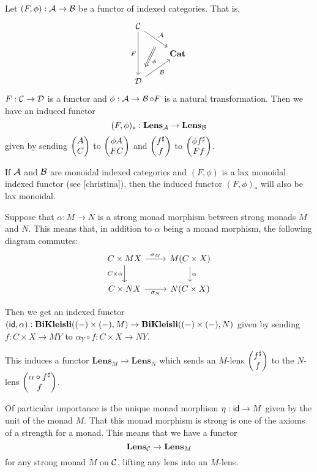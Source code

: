 \begin{prop}
  Let $(F, \phi) : \operatorname{\mathcal{A}} \to \operatorname{\mathcal{B}}$ be a functor of indexed categories. That is,
  \[
    \begin{tikzcd}
      \Ca \arrow[rd,"\Aa"{name=U} ] \arrow[dd,"F"']& \\
      & \textbf{Cat} \\
      \Da \arrow[Rightarrow,
      from=U, shorten <= 1em, shorten >= 1em, "\phi"] \arrow[ur, "\Ba"'] 
    \end{tikzcd}
  \]
  $F : \operatorname{\mathcal{C}} \to \operatorname{\mathcal{D}}$ is a functor and $\phi : \operatorname{\mathcal{A}} \to \operatorname{\mathcal{B}} \circ F$ is a natural
  transformation. Then we have an induced functor
  $$(F, \phi)_{\ast} : \textbf{Lens}_{\operatorname{\mathcal{A}}} \to \textbf{Lens}_{\operatorname{\mathcal{B}}}$$
  given by sending $\begin{pmatrix}{A} \\ {C} \end{pmatrix}$ to $\begin{pmatrix}{\phi A} \\ {F C} \end{pmatrix}$ and
  $\begin{pmatrix}{f^{\sharp}} \\ {f} \end{pmatrix}$ to $\begin{pmatrix}{\phi f^{\sharp}} \\ {F f} \end{pmatrix}$.

  If $\operatorname{\mathcal{A}}$ and $\operatorname{\mathcal{B}}$ are monoidal indexed categories and $(F, \phi)$ is a lax
  monoidal indexed functor (see [christina]), then the induced functor $(F,
  \phi)_{\ast}$ will also be lax monoidal.
\end{prop}

\begin{ex}
Suppose that $\alpha : M \to N$ is a strong monad morphism between strong monads $M$
and $N$. This means that, in addition to $\alpha$ being a monad morphism, the
following diagram commutes:
\[
  \begin{tikzcd}
    C \times M X \arrow[r,"\sigma_M"] \arrow[d, "C \times \alpha"'] & M(C \times X) \arrow[d,"\alpha"] \\
    C \times N X \arrow[r,"\sigma_N"'] & N(C \times X)
  \end{tikzcd}
\]

Then we get an indexed
functor $(\operatorname{\mathsf{id}}, \alpha) : \textbf{BiKleisli}((-) \times (-), M) \to
\textbf{BiKleisli}((-) \times (-), N)$ given by sending $f : C \times X \to M Y$
to $\alpha_Y \circ f : C \times X \to N Y$.

This induces a functor $\textbf{Lens}_{M} \to \textbf{Lens}_{N}$ which sends an
$M$-lens $\begin{pmatrix}{f^{\sharp}} \\ {f} \end{pmatrix}$ to the $N$-lens $\begin{pmatrix}{\alpha \circ f^{\sharp}} \\ {f} \end{pmatrix}$.

Of particular importance is the unique monad morphism $\eta : \operatorname{\mathsf{id}} \to M$ given
by the unit of the monad $M$. That this monad morphism is strong is one of the
axioms of a strength for a monad. This means that we have a functor
$$\textbf{Lens}_{\operatorname{\mathcal{C}}} \to \textbf{Lens}_M$$
for any strong monad $M$ on $\operatorname{\mathcal{C}}$, lifting any lens into an $M$-lens.
\end{ex}


